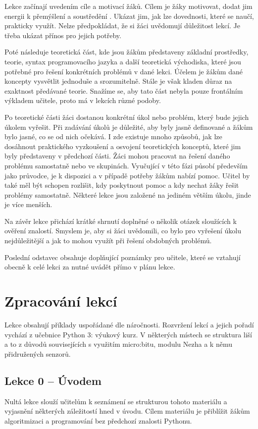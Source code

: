 \documentclass[
  digital,     %
  oneside,     %
  nosansbold,  %
  colorbold, %
  lof,         %
  nolot,         %
]{fithesis4}
\begin{document}
Lekce začínají uvedením cíle a motivací žáků. Cílem je žáky motivovat, dodat jim energii k přemýšlení a soustředění \cite{Filgona20}. Ukázat jim, jak lze dovednosti, které se naučí, prakticky využít. Nelze předpokládat, že si žáci uvědomují důležitost lekcí. Je třeba ukázat přínos pro jejich potřeby.

Poté následuje teoretická část, kde jsou žákům představeny základní prostředky, teorie, syntax programovacího jazyka a další teoretická východiska, které jsou potřebné pro řešení konkrétních problémů v dané lekci. Účelem je žákům dané koncepty vysvětlit jednoduše a srozumitelně. Stále je však kladen důraz na exaktnost předávané teorie. Snažíme se, aby tato část nebyla pouze frontálním výkladem učitele, proto má v lekcích různé podoby. %

Po teoretické části žáci dostanou konkrétní úkol nebo problém, který bude jejich úkolem vyřešit. Při zadávání úkolů je důležité, aby byly jasně definované a žákům bylo jasné, co se od nich očekává.  I zde existuje mnoho způsobů, jak lze dosáhnout praktického vyzkoušení a osvojení teoretických konceptů, které jim byly představeny v předchozí části. Žáci mohou pracovat na řešení daného problému samostatně nebo ve skupinách. Vyučující v této fázi působí především jako průvodce, je k dispozici a v případě potřeby žákům nabízí pomoc. Učitel by také měl být schopen rozlišit, kdy poskytnout pomoc a kdy nechat žáky řešit problémy samostatně. Některé lekce jsou založené na jediném větším úkolu, jinde je více menších.

Na závěr lekce přichází krátké shrnutí doplněné o několik otázek sloužících k ověření znalostí. Smyslem je, aby si žáci uvědomili, co bylo pro vyřešení úkolu nejdůležitější a jak to mohou využít při řešení obdobných problémů.

Poslední odstavec obsahuje doplňující poznámky pro učitele, které se vztahují obecně k celé lekci za nutné uvádět přímo v plánu lekce. %


\section{Zpracování lekcí}
Lekce obsahují příklady uspořádané dle náročnosti. Rozvržení lekcí a jejich pořadí vychází z učebnice Python 3: výukový kurz. V některých místech se struktura liší a to z důvodů souvisejících s využitím micro:bitu, modulu Nezha a k němu přidružených senzorů. 

\subsection{Lekce 0 -- Úvodem}
Nultá lekce slouží učitelům k seznámení se strukturou tohoto materiálu a vyjasnění některých záležitostí hned v úvodu. Cílem materiálu je přiblížit žákům algoritmizaci a programování bez předchozí znalosti Pythonu. 
\end{document}
